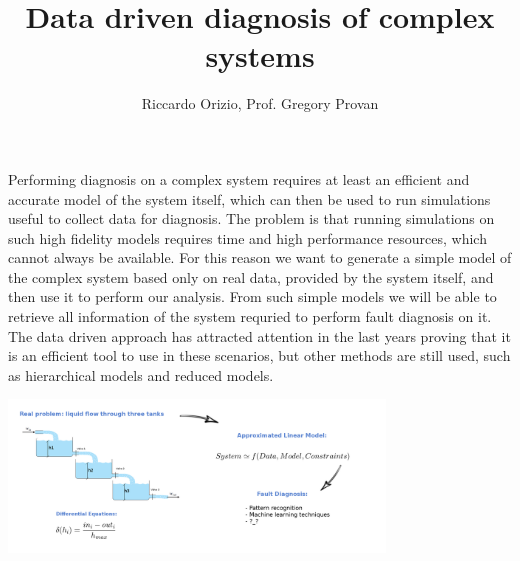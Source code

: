 \documentclass{tikzposter}
\title{Data driven diagnosis of complex systems}
\author{Riccardo Orizio, Prof. Gregory Provan}
\institute{University College Cork}
\begin{document}
	\maketitle[width=0.9\textwidth]

	{
		Performing diagnosis on a complex system requires at least an efficient
		and accurate model of the system itself, which can then be used to
		run simulations useful to collect data for diagnosis.
		The problem is that running simulations on such high fidelity models
		requires time and high performance resources, which cannot always be
		available.
		For this reason we want to generate a simple model of the complex system
		based only on real data, provided by the system itself, and then use it
		to perform our analysis.
		From such simple models we will be able to retrieve all information of
		the system requried to perform fault diagnosis on it.
		The data driven approach has attracted attention in the last years
		proving that it is an efficient tool to use in these scenarios, but
		other methods are still used, such as hierarchical models and reduced
		models.

		\begin{center}
			\includegraphics[width=0.75\textwidth]{./Images/3tanks.png}
		\end{center}
	}
\end{document}
